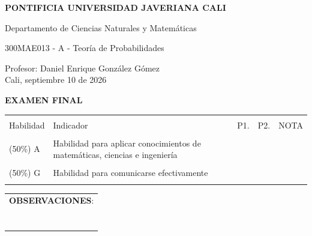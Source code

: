 \documentclass[10pt,letterpaper]{article}
\begin{document}
	\pagestyle{empty}
	

\textbf{PONTIFICIA UNIVERSIDAD JAVERIANA CALI}

Departamento de Ciencias Naturales y Matemáticas

300MAE013 - A - Teoría de Probabilidades

\begin{flushright}
Profesor: Daniel Enrique González Gómez \\  
Cali, septiembre 10 de 2026
\end{flushright}

\begin{center}
{\bf EXAMEN FINAL}
\end{center}

		\begin{tabular}{|p{1.5cm}|p{8.2cm}|p{2.2cm}|p{2.2cm}|p{2.4cm}|}
	\hline
	&&&&\\
	Habilidad & Indicador   &P1. & P2. &  NOTA\\  
	&&&&\\ \hline 
	(50\%) A& Habilidad para aplicar conocimientos de matemáticas, ciencias e ingeniería    &&&   \\ 
	&&&& \\ \hline              
	(50\%) G& Habilidad para comunicarse efectivamente &&&\\  
	&&&& \\  
	\hline  
\end{tabular}

\begin{tabular}{|p{18.2cm}|}
\hline      
{\textbf{OBSERVACIONES}:} \\ \\ 
\\ \\ 
\\ \\ 
\\ \\ 

\hline

\end{tabular}
\end{document}
